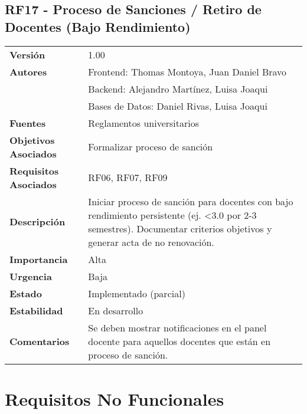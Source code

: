 \documentclass{article}
\begin{document}
\subsection*{RF17 - Proceso de Sanciones / Retiro de Docentes (Bajo Rendimiento)}
\begin{longtable}{>{\bfseries}l p{}}
Versión & 1.00 \\
Autores & Frontend: Thomas Montoya, Juan Daniel Bravo \\ 
        & Backend: Alejandro Martínez, Luisa Joaqui \\ 
        & Bases de Datos: Daniel Rivas, Luisa Joaqui \\
Fuentes & Reglamentos universitarios \\
Objetivos Asociados & Formalizar proceso de sanción \\
Requisitos Asociados & RF06, RF07, RF09 \\
Descripción & Iniciar proceso de sanción para docentes con bajo rendimiento persistente (ej. <3.0 por 2-3 semestres). Documentar criterios objetivos y generar acta de no renovación. \\
Importancia & Alta \\
Urgencia & Baja \\
Estado & Implementado (parcial) \\
Estabilidad & En desarrollo \\
Comentarios & Se deben mostrar notificaciones en el panel docente para aquellos docentes que están en proceso de sanción. \\
\end{longtable}

\section*{Requisitos No Funcionales}
\end{document}
